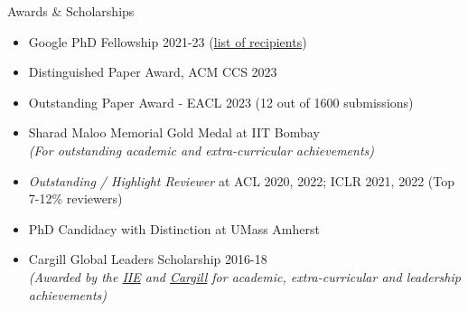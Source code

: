 \documentclass{resume} %
\begin{document}
\begin{rSection}{Awards \& Scholarships}
\vspace*{0.2in}
\begin{itemize}[leftmargin=*]
\setlength\itemsep{0.4em}
\item Google PhD Fellowship 2021-23 (\href{https://research.google/outreach/phd-fellowship/recipients/?category=2021}{list of recipients}) 
\item Distinguished Paper Award, ACM CCS 2023
\item Outstanding Paper Award - EACL 2023 (12 out of 1600 submissions)
\item Sharad Maloo Memorial Gold Medal at IIT Bombay\\
\textit{(For outstanding academic and extra-curricular achievements)}
\item \emph{Outstanding / Highlight Reviewer} at ACL 2020, 2022; ICLR 2021, 2022  (Top 7-12\% reviewers)
\item PhD Candidacy with Distinction at UMass Amherst
\item Cargill Global Leaders Scholarship 2016-18 \\
\textit{(Awarded by the \href{https://en.wikipedia.org/wiki/Institute_of_International_Education}{IIE} and \href{https://en.wikipedia.org/wiki/Cargill}{Cargill} for academic, extra-curricular and leadership achievements)}
\end{itemize}
\end{rSection}

\vspace*{0.1in}
\end{document}
